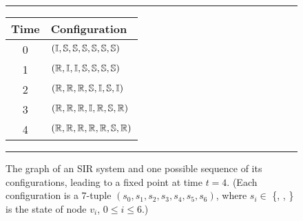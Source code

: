 \begin{figure}[tbh]
\rule{\textwidth}{0.01in}
\begin{minipage}[t]{0.5\textwidth}
\medskip
\begin{center}

\end{center}
\medskip
\end{minipage}
\hfill
\begin{minipage}[t]{0.5\textwidth}
\vspace*{0.3in}
\begin{center}
\begin{tabular}{|c|l|}\hline
\textbf{Time} & \textbf{Configuration} \\ \hline\hline
0 & $(\mbox{$\mathbb{I}$}, \mbox{$\mathbb{S}$}, \mbox{$\mathbb{S}$}, \mbox{$\mathbb{S}$}, \mbox{$\mathbb{S}$}, \mbox{$\mathbb{S}$}, \mbox{$\mathbb{S}$})$ \\ \hline 
1 & $(\mbox{$\mathbb{R}$}, \mbox{$\mathbb{I}$}, \mbox{$\mathbb{I}$}, \mbox{$\mathbb{S}$}, \mbox{$\mathbb{S}$}, \mbox{$\mathbb{S}$}, \mbox{$\mathbb{S}$})$ \\ \hline 
2 & $(\mbox{$\mathbb{R}$}, \mbox{$\mathbb{R}$}, \mbox{$\mathbb{R}$}, \mbox{$\mathbb{S}$}, \mbox{$\mathbb{I}$}, \mbox{$\mathbb{S}$}, \mbox{$\mathbb{I}$})$ \\ \hline 
3 & $(\mbox{$\mathbb{R}$}, \mbox{$\mathbb{R}$}, \mbox{$\mathbb{R}$}, \mbox{$\mathbb{I}$}, \mbox{$\mathbb{R}$}, \mbox{$\mathbb{S}$}, \mbox{$\mathbb{R}$})$ \\ \hline 
4 & $(\mbox{$\mathbb{R}$}, \mbox{$\mathbb{R}$}, \mbox{$\mathbb{R}$}, \mbox{$\mathbb{R}$}, \mbox{$\mathbb{R}$}, \mbox{$\mathbb{S}$}, \mbox{$\mathbb{R}$})$ \\ \hline 
\end{tabular}
\end{center}
\medskip
\end{minipage}
\caption{The graph of an SIR system and one possible sequence of its
configurations, leading to a fixed point at time $t = 4$. 
(Each configuration is a 7-tuple $(s_0, s_1, s_2, s_3, s_4, s_5, s_6)$,
where $s_i \in$ \{\sstate, \istate, \rstate\} is the
state of node $v_i$, $0 \leq i \leq 6$.)
}
\label{fig:sir_example}
\smallskip
\rule{\textwidth}{0.01in}
\end{figure}

